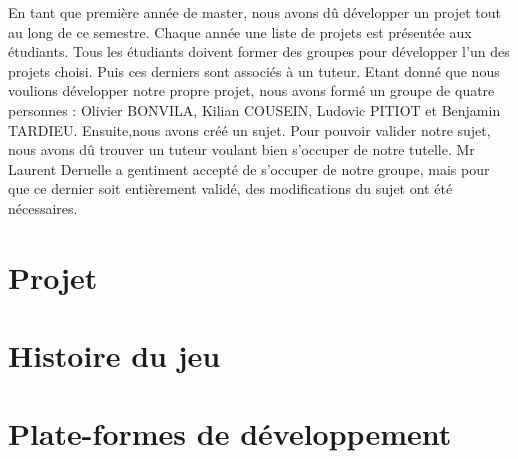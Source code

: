En tant que première année de master, nous avons dû développer un projet tout au long de ce semestre. Chaque année une liste de projets est présentée aux étudiants. Tous les étudiants doivent former des groupes pour développer l'un des projets choisi. Puis ces derniers sont associés à un tuteur. Etant donné que nous voulions développer notre propre projet, nous avons formé un groupe de quatre personnes : Olivier BONVILA, Kilian COUSEIN, Ludovic PITIOT et Benjamin TARDIEU. Ensuite,nous avons créé un sujet. Pour pouvoir valider notre sujet, nous avons dû trouver un tuteur voulant bien s'occuper de notre tutelle. Mr Laurent Deruelle a gentiment accepté de s'occuper de notre groupe, mais pour que ce dernier soit entièrement validé, des modifications du sujet ont été nécessaires.

\section{Projet}	
	
	
\section{Histoire du jeu}
	

\section{Plate-formes de développement}
	
